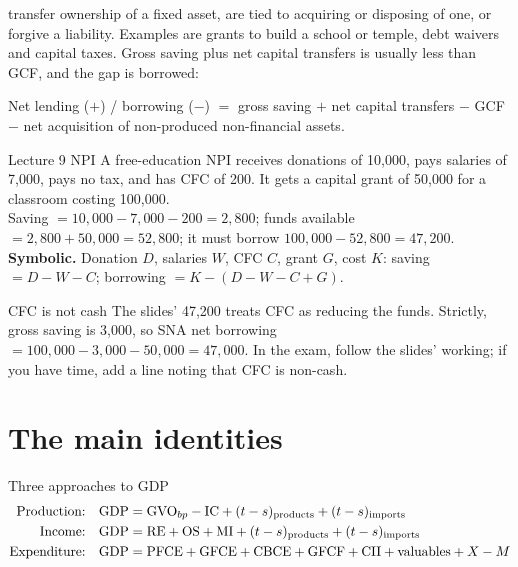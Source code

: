  transfer ownership of a fixed asset, are tied to acquiring or disposing
of one, or forgive a liability. Examples are grants to build a school or temple, debt waivers and
capital taxes. Gross saving plus net capital transfers is usually less than GCF, and the gap is
borrowed:
\begin{center}
Net lending ($+$) / borrowing ($-$) $=$ gross saving $+$ net capital transfers $-$ GCF\\
$-$ net acquisition of non-produced non-financial assets.
\end{center}

\begin{tmpl}{Lecture 9 NPI}
\small A free-education NPI receives donations of 10,000, pays salaries of 7,000, pays no tax, and
has CFC of 200. It gets a capital grant of 50,000 for a classroom costing 100,000.\\
Saving $=10{,}000-7{,}000-200=2{,}800$; funds available $=2{,}800+50{,}000=52{,}800$; it must
borrow $100{,}000-52{,}800=47{,}200$.\\
\textbf{Symbolic.} Donation $D$, salaries $W$, CFC $C$, grant $G$, cost $K$: saving $=D-W-C$;
borrowing $=K-(D-W-C+G)$.
\end{tmpl}
\begin{trap}{CFC is not cash}
\small The slides' 47,200 treats CFC as reducing the funds. Strictly, gross saving is 3,000, so
SNA net borrowing $=100{,}000-3{,}000-50{,}000=47{,}000$. In the exam, follow the slides' working;
if you have time, add a line noting that CFC is non-cash.
\end{trap}

\section{The main identities}\label{sec:id}

\begin{keybox}{Three approaches to GDP}
\vspace{-8pt}
\begin{align*}
\text{Production:}\quad \mathrm{GDP} &= \mathrm{GVO}_{bp}-\mathrm{IC}+(t-s)_{\text{products}}+(t-s)_{\text{imports}}\\
\text{Income:}\quad \mathrm{GDP} &= \mathrm{RE}+\mathrm{OS}+\mathrm{MI}+(t-s)_{\text{products}}+(t-s)_{\text{imports}}\\
\text{Expenditure:}\quad \mathrm{GDP} &= \mathrm{PFCE}+\mathrm{GFCE}+\mathrm{CBCE}+\mathrm{GFCF}+\mathrm{CII}+\text{valuables}+X-M
\end{align*}
\end{keybox}

